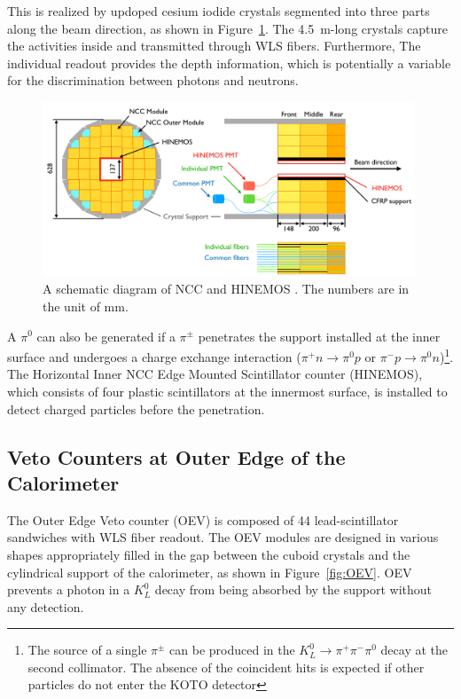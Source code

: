 This is realized by updoped cesium iodide crystals segmented into three parts along the beam direction, as shown in Figure~\ref{fig:NCC_config}. The 4.5~m-long crystals capture the activities inside and transmitted through WLS fibers. Furthermore, The individual readout provides the depth information, which is potentially a variable for the discrimination between photons and neutrons.

\begin{figure}[h]
\begin{center}
\captionsetup{width=.99\linewidth}
\includegraphics[width=0.99\textwidth]{Figures/Chapter3/NCC_config.pdf}
\caption{A schematic diagram of NCC and HINEMOS \parencite{Maeda, NCC}. The numbers are in the unit of mm.}
\label{fig:NCC_config}
\end{center}
\end{figure}

A $\pi^0$ can also be generated if a $\pi^{\pm}$ penetrates the support installed at the inner surface and undergoes a charge exchange interaction (${\pi^+n \to \pi^0 p}$ or ${\pi^-p \to \pi^0 n}$)\footnote{The source of a single $\pi^{\pm}$ can be produced in the ${K_L^0\to\pi^+\pi^-\pi^0}$ decay at the second collimator. The absence of the coincident hits is expected if other particles do not enter the KOTO detector}. The Horizontal Inner NCC Edge Mounted Scintillator counter (HINEMOS), which consists of four plastic scintillators at the innermost surface, is installed to detect charged particles before the penetration. 

\subsection{Veto Counters at Outer Edge of the Calorimeter}
The Outer Edge Veto counter (OEV) \parencite{OEV} is composed of 44 lead-scintillator sandwiches with WLS fiber readout. The OEV modules are designed in various shapes appropriately filled in the gap between the cuboid crystals and the cylindrical support of the calorimeter, as shown in Figure~\ref{fig:OEV}. OEV prevents a photon in a $K_L^0$ decay from being absorbed by the support without any detection. 

